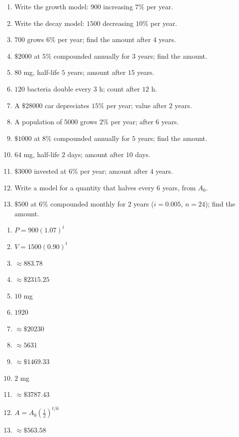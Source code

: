 \documentclass[11pt]{article}
\begin{document}
\begin{recapbox}
\begin{multicols}{2}
\small
\begin{enumerate}[leftmargin=*,itemsep=3pt]
  \item Write the growth model: $900$ increasing $7\%$ per year.
  \item Write the decay model: $1500$ decreasing $10\%$ per year.
  \item $700$ grows $6\%$ per year; find the amount after $4$ years.
  \item $\$2000$ at $5\%$ compounded annually for $3$ years; find the amount.
  \item $80$ mg, half-life $5$ years; amount after $15$ years.
  \item $120$ bacteria double every $3$ h; count after $12$ h.
  \item A $\$28000$ car depreciates $15\%$ per year; value after $2$ years.
  \item A population of $5000$ grows $2\%$ per year; after $6$ years.
  \item $\$1000$ at $8\%$ compounded annually for $5$ years; find the amount.
  \item $64$ mg, half-life $2$ days; amount after $10$ days.
  \item $\$3000$ invested at $6\%$ per year; amount after $4$ years.
  \item Write a model for a quantity that halves every $6$ years, from $A_0$.
  \item $\$500$ at $6\%$ compounded monthly for $2$ years ($i=0.005$, $n=24$); find the amount.
\end{enumerate}
\end{multicols}
\end{recapbox}

\begin{keybox}
\begin{multicols}{2}
\small
\begin{enumerate}[leftmargin=*,itemsep=3pt]
  \item $P=900(1.07)^{t}$
  \item $V=1500(0.90)^{t}$
  \item $\approx 883.78$
  \item $\approx \$2315.25$
  \item $10$ mg
  \item $1920$
  \item $\approx \$20230$
  \item $\approx 5631$
  \item $\approx \$1469.33$
  \item $2$ mg
  \item $\approx \$3787.43$
  \item $A=A_0\left(\tfrac12\right)^{t/6}$
  \item $\approx \$563.58$
\end{enumerate}
\end{multicols}
\end{keybox}
\end{document}
